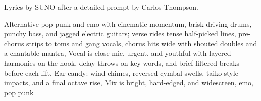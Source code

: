 
\begin{notes}
Lyrics by SUNO after a detailed prompt by Carlos Thompson.
\end{notes}
\begin{style}
Alternative pop punk and emo with cinematic momentum, brisk driving drums, punchy bass, and jagged electric guitars; verse rides tense half-picked lines, pre-chorus strips to toms and gang vocals, chorus hits wide with shouted doubles and a chantable mantra, Vocal is close-mic, urgent, and youthful with layered harmonies on the hook, delay throws on key words, and brief filtered breaks before each lift, Ear candy: wind chimes, reversed cymbal swells, taiko-style impacts, and a final octave rise, Mix is bright, hard-edged, and widescreen, emo, pop punk
\end{style}
